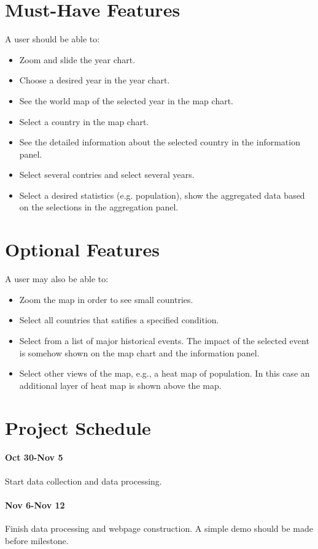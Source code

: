 \documentclass[12pt, fullpage,letterpaper]{article}
\begin{document}
\section{Must-Have Features}
A user should be able to:
\begin{itemize}
    \item Zoom and slide the year chart.
    \item Choose a desired year in the year chart. 
    \item See the world map of the selected year in the map chart.
    \item Select a country in the map chart.
    \item See the detailed information about the selected country in the information panel.
    \item Select several contries and select several years.
    \item Select a desired statistics (e.g. population), show the aggregated data based on the selections in the aggregation panel.
\end{itemize}

\section{Optional Features}
A user may also be able to:
\begin{itemize}
    \item Zoom the map in order to see small countries.
    \item Select all countries that satifies a specified condition.
    \item Select from a list of major historical events. The impact of the selected event is somehow shown on the map chart and the information panel.
    \item Select other views of the map, e.g., a heat map of population. In this case an additional layer of heat map is shown above the map.
\end{itemize}

\section{Project Schedule}
\paragraph{Oct 30-Nov 5} Start data collection and data processing.
\paragraph{Nov 6-Nov 12} Finish data processing and webpage construction. A simple demo should be made before milestone.
\end{document}
